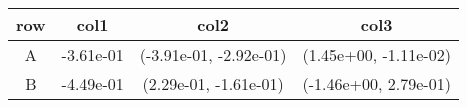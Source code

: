 \begin{tabular}{cccc}
\toprule
row&col1&col2&col3\tabularnewline
\midrule
A&-3.61e-01& (-3.91e-01, -2.92e-01)& (1.45e+00, -1.11e-02)\tabularnewline
B&-4.49e-01& (2.29e-01, -1.61e-01)& (-1.46e+00, 2.79e-01)\tabularnewline
\bottomrule
\end{tabular}

